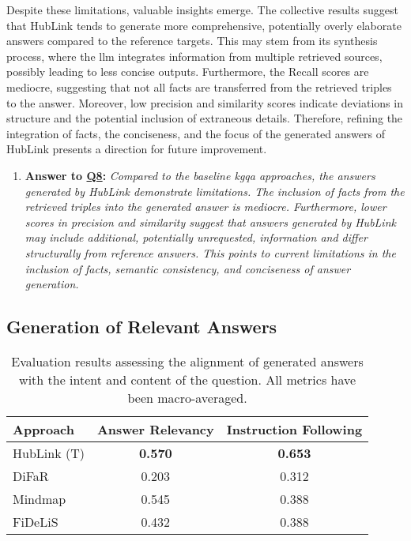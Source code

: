 Despite these limitations, valuable insights emerge. The collective results suggest that HubLink tends to generate more comprehensive, potentially overly elaborate answers compared to the reference targets. This may stem from its synthesis process, where the \gls{llm} integrates information from multiple retrieved sources, possibly leading to less concise outputs. Furthermore, the Recall scores are mediocre, suggesting that not all facts are transferred from the retrieved triples to the answer. Moreover, low precision and similarity scores indicate deviations in structure and the potential inclusion of extraneous details. Therefore, refining the integration of facts, the conciseness, and the focus of the generated answers of HubLink presents a direction for future improvement.

\begin{enumerate}[label={}]
 \item \textbf{Answer to \hyperref[sec:evaluation_gqm_plan]{Q8}:} \textit{Compared to the baseline \gls{kgqa} approaches, the answers generated by HubLink demonstrate limitations. The inclusion of facts from the retrieved triples into the generated answer is mediocre. Furthermore, lower scores in precision and similarity suggest that answers generated by HubLink may include additional, potentially unrequested, information and differ structurally from reference answers. This points to current limitations in the inclusion of facts, semantic consistency, and conciseness of answer generation.}
\end{enumerate}


\subsection{Generation of Relevant Answers}

\begin{table}[t]
\centering
\begin{tabular}{@{}lcc}
\toprule
Approach & Answer Relevancy & Instruction Following  \\ 
\midrule
HubLink (T) & \textbf{0.570} & \textbf{0.653} \\
DiFaR & 0.203 & 0.312 \\
Mindmap & 0.545 & 0.388 \\
FiDeLiS & 0.432 & 0.388 \\
\bottomrule
\end{tabular}%
\caption[Results of Alignment with Intent and Content of the Question]{Evaluation results assessing the alignment of generated answers with the intent and content of the question. All metrics have been macro-averaged.}
\label{tab:q21:intent_and_content_alignment}
\end{table}

